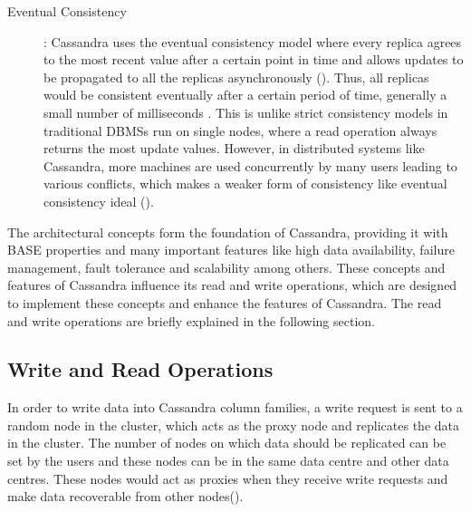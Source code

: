 \begin{description}
\item [Eventual Consistency]:
Cassandra uses the eventual consistency model where every replica agrees to the
most recent value after a certain point in time and allows updates to be
propagated to all the replicas asynchronously  (). Thus,  all
replicas would be consistent eventually after a certain period of time, 
generally a small number of milliseconds . 
This is unlike strict consistency models in traditional \acp{DBMS} run on single
nodes,  where a read operation always returns the most update values.  However,  in
distributed systems like Cassandra,  more machines are used concurrently by many
users leading to various conflicts,  which makes a weaker form of consistency
like eventual consistency  ideal (). 

\end{description}
The architectural concepts form the foundation of Cassandra,   providing it
with BASE properties and many important features like high data availability,
failure management, fault tolerance and scalability among others.  These
concepts and features of Cassandra influence its read and write operations,
which are designed to implement these concepts and enhance the features of
Cassandra.  The read and write operations are briefly explained in the following
section.

\subsection{Write and Read Operations}
\label{ss:Background-Cassandra-Operations} 
In order to write data into Cassandra column families,  a write request is sent
to a random node in the cluster,  which acts as the proxy node and replicates the
data in the cluster. 
The number of nodes on which data should be replicated can be set by the users
and these  nodes can be in the same data centre and 
other data centres.  These nodes would act as proxies when they receive
write requests and  make data recoverable from other nodes(). 
		

